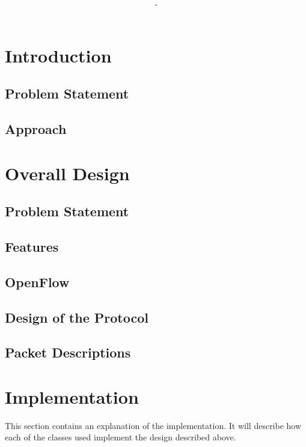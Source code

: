 \documentclass{article}
\title{\textbf{\moduleCode\ \moduleName\ \assignmentTitle}}
\author{\authorName\ -\ \authorID}
\begin{document}
\captionsetup{width=.8\linewidth}

\maketitle
\tableofcontents

\newpage

\section{Introduction}

\subsection{Problem Statement}

\subsection{Approach}

\section{Overall Design}

\subsection{Problem Statement}

\subsection{Features}

\subsection{OpenFlow}

\subsection{Design of the Protocol}

\subsection{Packet Descriptions}

\section{Implementation}
This section contains an explanation of the implementation. It will describe how
each of the classes used implement the design described above.
\end{document}
